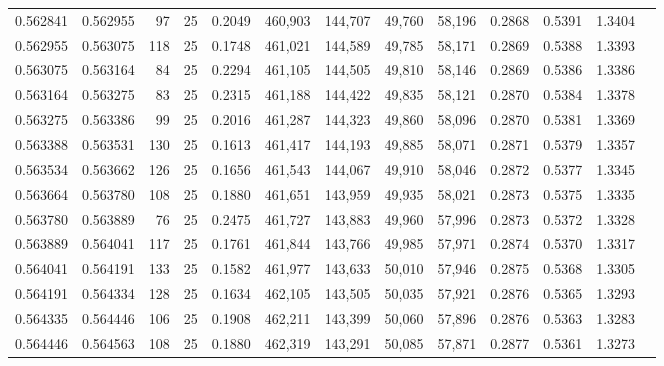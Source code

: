 \begin{tabular}{rrrrrrrrrrrrr}
0.562841 & 0.562955 &    97 &  25 &                                     0.2049 & 460,903 & 144,707 &  49,760 &  58,196 & 0.2868 & 0.5391 & 1.3404 \\
0.562955 & 0.563075 &   118 &  25 &                                     0.1748 & 461,021 & 144,589 &  49,785 &  58,171 & 0.2869 & 0.5388 & 1.3393 \\
0.563075 & 0.563164 &    84 &  25 &                                     0.2294 & 461,105 & 144,505 &  49,810 &  58,146 & 0.2869 & 0.5386 & 1.3386 \\
0.563164 & 0.563275 &    83 &  25 &                                     0.2315 & 461,188 & 144,422 &  49,835 &  58,121 & 0.2870 & 0.5384 & 1.3378 \\
0.563275 & 0.563386 &    99 &  25 &                                     0.2016 & 461,287 & 144,323 &  49,860 &  58,096 & 0.2870 & 0.5381 & 1.3369 \\
0.563388 & 0.563531 &   130 &  25 &                                     0.1613 & 461,417 & 144,193 &  49,885 &  58,071 & 0.2871 & 0.5379 & 1.3357 \\
0.563534 & 0.563662 &   126 &  25 &                                     0.1656 & 461,543 & 144,067 &  49,910 &  58,046 & 0.2872 & 0.5377 & 1.3345 \\
0.563664 & 0.563780 &   108 &  25 &                                     0.1880 & 461,651 & 143,959 &  49,935 &  58,021 & 0.2873 & 0.5375 & 1.3335 \\
0.563780 & 0.563889 &    76 &  25 &                                     0.2475 & 461,727 & 143,883 &  49,960 &  57,996 & 0.2873 & 0.5372 & 1.3328 \\
0.563889 & 0.564041 &   117 &  25 &                                     0.1761 & 461,844 & 143,766 &  49,985 &  57,971 & 0.2874 & 0.5370 & 1.3317 \\
0.564041 & 0.564191 &   133 &  25 &                                     0.1582 & 461,977 & 143,633 &  50,010 &  57,946 & 0.2875 & 0.5368 & 1.3305 \\
0.564191 & 0.564334 &   128 &  25 &                                     0.1634 & 462,105 & 143,505 &  50,035 &  57,921 & 0.2876 & 0.5365 & 1.3293 \\
0.564335 & 0.564446 &   106 &  25 &                                     0.1908 & 462,211 & 143,399 &  50,060 &  57,896 & 0.2876 & 0.5363 & 1.3283 \\
0.564446 & 0.564563 &   108 &  25 &                                     0.1880 & 462,319 & 143,291 &  50,085 &  57,871 & 0.2877 & 0.5361 & 1.3273 \\

\end{tabular}
